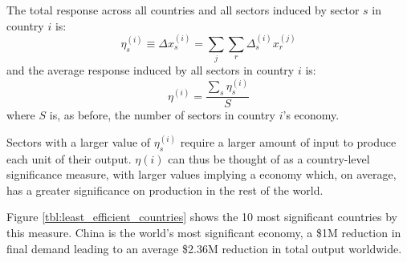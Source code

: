 \documentclass[a4paper]{article}
\begin{document}
The total response across all countries and all sectors induced by sector $s$ in country $i$ is:
\begin{equation}
\eta_s^{(i)} \equiv \Delta x_{s}^{(i)} = \sum_j \sum_r \Delta_{s}^{(i)} x_{r}^{(j)}
\end{equation}
and the average response induced by all sectors in country $i$ is:
\begin{equation}
\eta^{(i)} = \frac{\sum_s \eta_s^{(i)}}{S}
\end{equation}
where $S$ is, as before, the number of sectors in country $i$'s economy.

Sectors with a larger value of $\eta_s^{(i)}$ require a larger amount of input to produce each unit of their output. $\eta{(i)}$ can thus be thought of as a country-level significance measure, with larger values implying a economy which, on average, has a greater significance on production in the rest of the world.

Figure \ref{tbl:least_efficient_countries} shows the 10 most significant countries by this measure.
China is the world's most significant economy, a \$1M reduction in final demand leading to an average \$2.36M reduction in total output worldwide.
\end{document}
